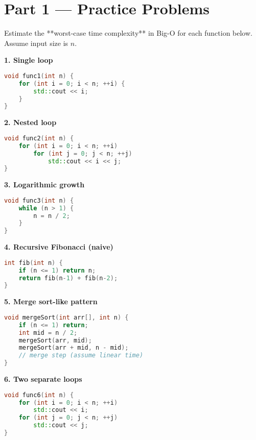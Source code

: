 \documentclass{article}
\begin{document}
\newpage

\section*{Part 1 — Practice Problems}

Estimate the **worst-case time complexity** in Big-O for each function below. Assume input size is \( n \).

\vspace{1em}

\textbf{1. Single loop}
\begin{lstlisting}[language=C++]
void func1(int n) {
    for (int i = 0; i < n; ++i) {
        std::cout << i;
    }
}
\end{lstlisting}

\vspace{0.5em}
\textbf{2. Nested loop}
\begin{lstlisting}[language=C++]
void func2(int n) {
    for (int i = 0; i < n; ++i)
        for (int j = 0; j < n; ++j)
            std::cout << i << j;
}
\end{lstlisting}

\vspace{0.5em}
\textbf{3. Logarithmic growth}
\begin{lstlisting}[language=C++]
void func3(int n) {
    while (n > 1) {
        n = n / 2;
    }
}
\end{lstlisting}

\vspace{0.5em}
\textbf{4. Recursive Fibonacci (naive)}
\begin{lstlisting}[language=C++]
int fib(int n) {
    if (n <= 1) return n;
    return fib(n-1) + fib(n-2);
}
\end{lstlisting}

\vspace{0.5em}
\textbf{5. Merge sort-like pattern}
\begin{lstlisting}[language=C++]
void mergeSort(int arr[], int n) {
    if (n <= 1) return;
    int mid = n / 2;
    mergeSort(arr, mid);
    mergeSort(arr + mid, n - mid);
    // merge step (assume linear time)
}
\end{lstlisting}

\vspace{0.5em}
\textbf{6. Two separate loops}
\begin{lstlisting}[language=C++]
void func6(int n) {
    for (int i = 0; i < n; ++i)
        std::cout << i;
    for (int j = 0; j < n; ++j)
        std::cout << j;
}
\end{lstlisting}
\end{document}
